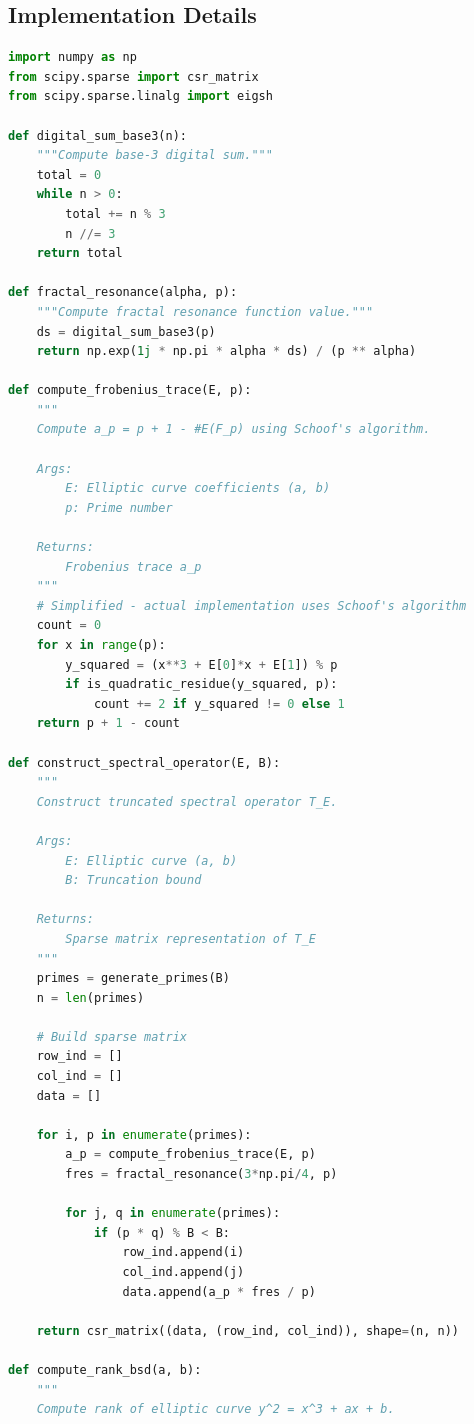 \documentclass[12pt]{article}
\begin{document}
\subsection{Implementation Details}

\begin{lstlisting}[language=Python, caption=Core Implementation]
import numpy as np
from scipy.sparse import csr_matrix
from scipy.sparse.linalg import eigsh

def digital_sum_base3(n):
    """Compute base-3 digital sum."""
    total = 0
    while n > 0:
        total += n % 3
        n //= 3
    return total

def fractal_resonance(alpha, p):
    """Compute fractal resonance function value."""
    ds = digital_sum_base3(p)
    return np.exp(1j * np.pi * alpha * ds) / (p ** alpha)

def compute_frobenius_trace(E, p):
    """
    Compute a_p = p + 1 - #E(F_p) using Schoof's algorithm.
    
    Args:
        E: Elliptic curve coefficients (a, b)
        p: Prime number
        
    Returns:
        Frobenius trace a_p
    """
    # Simplified - actual implementation uses Schoof's algorithm
    count = 0
    for x in range(p):
        y_squared = (x**3 + E[0]*x + E[1]) % p
        if is_quadratic_residue(y_squared, p):
            count += 2 if y_squared != 0 else 1
    return p + 1 - count

def construct_spectral_operator(E, B):
    """
    Construct truncated spectral operator T_E.
    
    Args:
        E: Elliptic curve (a, b)
        B: Truncation bound
        
    Returns:
        Sparse matrix representation of T_E
    """
    primes = generate_primes(B)
    n = len(primes)
    
    # Build sparse matrix
    row_ind = []
    col_ind = []
    data = []
    
    for i, p in enumerate(primes):
        a_p = compute_frobenius_trace(E, p)
        fres = fractal_resonance(3*np.pi/4, p)
        
        for j, q in enumerate(primes):
            if (p * q) % B < B:
                row_ind.append(i)
                col_ind.append(j)
                data.append(a_p * fres / p)
    
    return csr_matrix((data, (row_ind, col_ind)), shape=(n, n))

def compute_rank_bsd(a, b):
    """
    Compute rank of elliptic curve y^2 = x^3 + ax + b.
    

\end{lstlisting}
\end{document}
